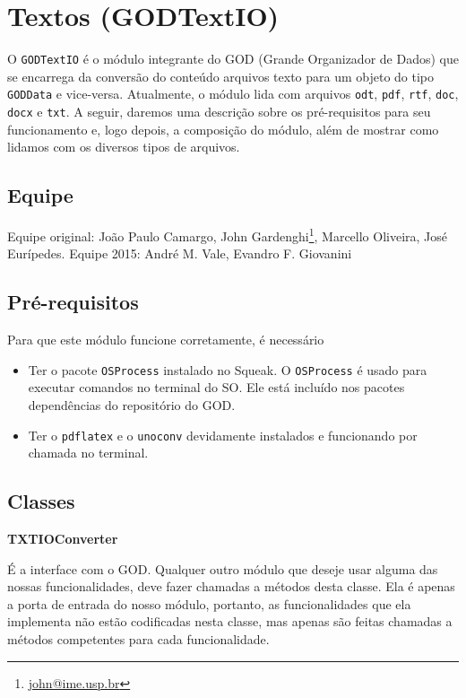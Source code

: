 \section{Textos (GODTextIO)}

O \verb|GODTextIO| é o módulo integrante do GOD (Grande Organizador de
Dados) que se encarrega da conversão do conteúdo arquivos texto para
um objeto do tipo \verb|GODData| e vice-versa. Atualmente, o módulo
lida com arquivos \verb|odt|, \verb|pdf|, \verb|rtf|, \verb|doc|, \verb|docx| e \verb|txt|. A seguir, daremos uma descrição sobre os pré-requisitos para seu
funcionamento e, logo depois, a composição do módulo, além de mostrar
como lidamos com os diversos tipos de arquivos.

\subsection{Equipe}

Equipe original: João Paulo Camargo, John
Gardenghi\footnote{\href{mailto:john@ime.usp.br}{john@ime.usp.br}},
Marcello Oliveira, José Eurípedes.
Equipe 2015: André M. Vale, Evandro F. Giovanini


\subsection{Pré-requisitos}

Para que este módulo funcione corretamente, é necessário
\begin{itemize}
\item Ter o pacote \verb|OSProcess| instalado no Squeak. O \verb|OSProcess| é usado para executar comandos no terminal do SO. Ele está incluído nos pacotes dependências do repositório do GOD.
\item Ter o \verb|pdflatex| e o \verb|unoconv| devidamente instalados e funcionando por chamada no terminal.
\end{itemize}

\subsection{Classes}

\vspace{1em}
\textbf{TXTIOConverter}

É a interface com o GOD. Qualquer outro módulo que deseje usar alguma
das nossas funcionalidades, deve fazer chamadas a métodos desta
classe. Ela é apenas a porta de entrada do nosso módulo, portanto, as
funcionalidades que ela implementa não estão codificadas nesta classe,
mas apenas são feitas chamadas a métodos competentes para cada
funcionalidade.

